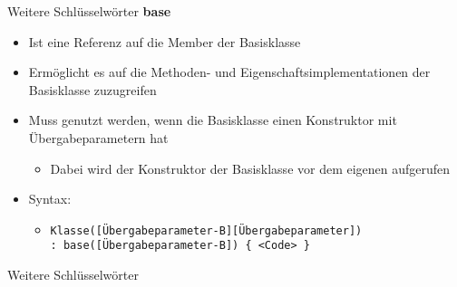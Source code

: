 \begin{frame}{Weitere Schlüsselwörter}
	\textbf{base}\\
	\begin{itemize}
		\item Ist eine Referenz auf die Member der Basisklasse
		\item Ermöglicht es auf die Methoden- und Eigenschaftsimplementationen der Basisklasse zuzugreifen
	\end{itemize}
	\begin{itemize}
		\item Muss genutzt werden, wenn die Basisklasse einen Konstruktor mit Übergabeparametern hat
		\begin{itemize}
			\item Dabei wird der Konstruktor der Basisklasse vor dem eigenen aufgerufen
		\end{itemize}
		\item Syntax:
		\begin{itemize}
			\item \texttt{\alert{Klasse}(\alert{[Übergabeparameter-B][Übergabeparameter]})\\ : base(\alert{[Übergabeparameter-B]}) \{ \alert{<Code>} \}}
		\end{itemize}
	\end{itemize}
\end{frame}

\begin{frame}{Weitere Schlüsselwörter}
	
\end{frame}


